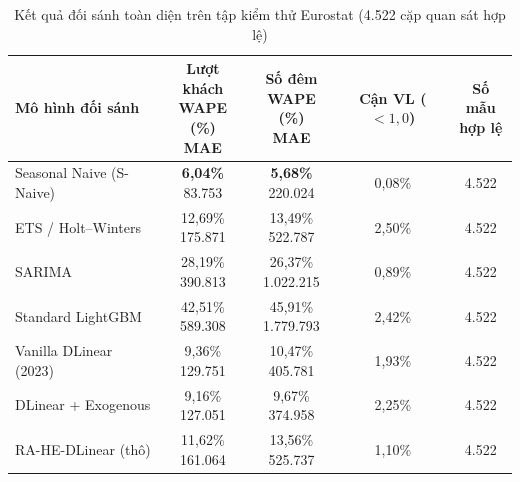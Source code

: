 \documentclass[10pt,journal,compsoc]{IEEEtran}
\begin{document}
\begin{table}[!htbp]
\centering
\caption{Kết quả đối sánh toàn diện trên tập kiểm thử Eurostat (4.522 cặp quan sát hợp lệ)}
\label{tab:main_benchmark}
\footnotesize
\setlength{\tabcolsep}{1.8pt}
\renewcommand{\arraystretch}{1.05}
\begin{tabular}{p{2.6cm}cccc}
\toprule
\textbf{Mô hình đối sánh} & \shortstack{\textbf{Lượt khách} \\ \textbf{WAPE (\%)} \\ \scriptsize \textbf{MAE}} & \shortstack{\textbf{Số đêm} \\ \textbf{WAPE (\%)} \\ \scriptsize \textbf{MAE}} & \shortstack{\textbf{Cận VL} \\ \textbf{($<1,0$)}} & \shortstack{\textbf{Số mẫu} \\ \textbf{hợp lệ}} \\
\midrule
Seasonal Naive (S-Naive) & \shortstack{\textbf{6,04\%} \\ \scriptsize 83.753} & \shortstack{\textbf{5,68\%} \\ \scriptsize 220.024} & 0,08\% & 4.522 \\
ETS / Holt--Winters & \shortstack{12,69\% \\ \scriptsize 175.871} & \shortstack{13,49\% \\ \scriptsize 522.787} & 2,50\% & 4.522 \\
SARIMA & \shortstack{28,19\% \\ \scriptsize 390.813} & \shortstack{26,37\% \\ \scriptsize 1.022.215} & 0,89\% & 4.522 \\
Standard LightGBM & \shortstack{42,51\% \\ \scriptsize 589.308} & \shortstack{45,91\% \\ \scriptsize 1.779.793} & 2,42\% & 4.522 \\
Vanilla DLinear (2023) & \shortstack{9,36\% \\ \scriptsize 129.751} & \shortstack{10,47\% \\ \scriptsize 405.781} & 1,93\% & 4.522 \\
DLinear + Exogenous & \shortstack{9,16\% \\ \scriptsize 127.051} & \shortstack{9,67\% \\ \scriptsize 374.958} & 2,25\% & 4.522 \\
\midrule
RA-HE-DLinear (thô) & \shortstack{11,62\% \\ \scriptsize 161.064} & \shortstack{13,56\% \\ \scriptsize 525.737} & 1,10\% & 4.522 \\

\end{tabular}
\end{table}
\end{document}
